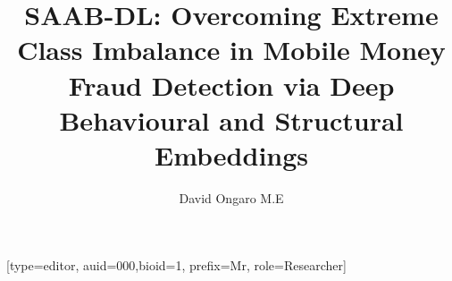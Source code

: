 \documentclass[a4paper,fleqn]{cas-sc}
\begin{document}
\let\WriteBookmarks\relax
\renewcommand{\topfraction}{0.85}
\renewcommand{\bottomfraction}{0.85}
\renewcommand{\textfraction}{0.10}
\renewcommand{\floatpagefraction}{0.75}



\title [mode = title]{SAAB-DL: Overcoming Extreme Class Imbalance in Mobile Money Fraud Detection via Deep Behavioural and Structural Embeddings}                      
\tnotemark[1,2]




%
\author[1]{David Ongaro M.E}[type=editor,
                        auid=000,bioid=1,
                        prefix=Mr,
                        role=Researcher]

\fnmark[1]






\end{document}
